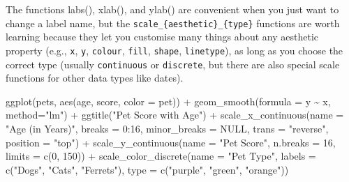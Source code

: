 \documentclass[
  oneside]{book}
\newenvironment{Shaded}{\begin{snugshade}}{\end{snugshade}}
\newcommand{\AttributeTok}[1]{\textcolor[rgb]{0.77,0.63,0.00}{#1}}
\newcommand{\ConstantTok}[1]{\textcolor[rgb]{0.00,0.00,0.00}{#1}}
\newcommand{\DecValTok}[1]{\textcolor[rgb]{0.00,0.00,0.81}{#1}}
\newcommand{\FunctionTok}[1]{\textcolor[rgb]{0.00,0.00,0.00}{#1}}
\newcommand{\NormalTok}[1]{#1}
\newcommand{\SpecialCharTok}[1]{\textcolor[rgb]{0.00,0.00,0.00}{#1}}
\newcommand{\StringTok}[1]{\textcolor[rgb]{0.31,0.60,0.02}{#1}}
\begin{document}
The functions {labs}{(}{)}, {xlab}{(}{)}, and {ylab}{(}{)} are convenient when you just want to change a label name, but the \texttt{scale\_\{aesthetic\}\_\{type\}} functions are worth learning because they let you customise many things about any aesthetic property (e.g., \texttt{x}, \texttt{y}, \texttt{colour}, \texttt{fill}, \texttt{shape}, \texttt{linetype}), as long as you choose the correct type (usually \texttt{continuous} or \texttt{discrete}, but there are also special scale functions for other data types like dates).

\begin{Shaded}
\begin{Highlighting}[]
\FunctionTok{ggplot}\NormalTok{(pets, }\FunctionTok{aes}\NormalTok{(age, score, }\AttributeTok{color =}\NormalTok{ pet)) }\SpecialCharTok{+}
  \FunctionTok{geom\_smooth}\NormalTok{(}\AttributeTok{formula =}\NormalTok{ y }\SpecialCharTok{\textasciitilde{}}\NormalTok{ x, }\AttributeTok{method=}\StringTok{"lm"}\NormalTok{) }\SpecialCharTok{+}
  \FunctionTok{ggtitle}\NormalTok{(}\StringTok{"Pet Score with Age"}\NormalTok{) }\SpecialCharTok{+}
  \FunctionTok{scale\_x\_continuous}\NormalTok{(}\AttributeTok{name =} \StringTok{"Age (in Years)"}\NormalTok{, }
                     \AttributeTok{breaks =} \DecValTok{0}\SpecialCharTok{:}\DecValTok{16}\NormalTok{,}
                     \AttributeTok{minor\_breaks =} \ConstantTok{NULL}\NormalTok{, }
                     \AttributeTok{trans =} \StringTok{"reverse"}\NormalTok{,}
                     \AttributeTok{position =} \StringTok{"top"}\NormalTok{) }\SpecialCharTok{+}
  \FunctionTok{scale\_y\_continuous}\NormalTok{(}\AttributeTok{name =} \StringTok{"Pet Score"}\NormalTok{, }
                     \AttributeTok{n.breaks =} \DecValTok{16}\NormalTok{, }
                     \AttributeTok{limits =} \FunctionTok{c}\NormalTok{(}\DecValTok{0}\NormalTok{, }\DecValTok{150}\NormalTok{)) }\SpecialCharTok{+}
  \FunctionTok{scale\_color\_discrete}\NormalTok{(}\AttributeTok{name =} \StringTok{"Pet Type"}\NormalTok{, }
                       \AttributeTok{labels =} \FunctionTok{c}\NormalTok{(}\StringTok{"Dogs"}\NormalTok{, }\StringTok{"Cats"}\NormalTok{, }\StringTok{"Ferrets"}\NormalTok{), }
                       \AttributeTok{type =} \FunctionTok{c}\NormalTok{(}\StringTok{"purple"}\NormalTok{, }\StringTok{"green"}\NormalTok{, }\StringTok{"orange"}\NormalTok{))}
\end{Highlighting}
\end{Shaded}
\end{document}
